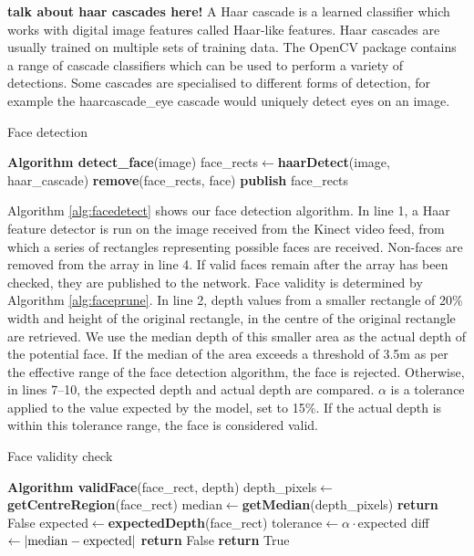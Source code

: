 \documentclass[conference]{IEEEtran}
\begin{document}
\textbf{talk about haar cascades here!}
A Haar cascade is a learned classifier which works with digital image features called Haar-like features. Haar cascades are usually trained on multiple sets of training data. The OpenCV package contains a range of cascade classifiers which can be used to perform a variety of detections. Some cascades are specialised to different forms of detection, for example the haarcascade\_eye cascade would uniquely detect eyes on an image.

\begin{algorithm}
  \caption{Face detection}
  \label{alg:facedetect}
  \begin{algorithmic}[1]
    \State \textbf{Algorithm detect\_face}\textnormal{(image)}
    \State face\_rects$\leftarrow$\textbf{haarDetect}(image, haar\_cascade)
    \State \textbf{remove}(face\_rects, face)
    \EndIf
    \EndFor
    \State \textbf{publish} face\_rects
  \end{algorithmic}
\end{algorithm}
Algorithm \ref{alg:facedetect} shows our face detection algorithm. In line 1, a Haar feature detector is run on the image received from the Kinect video feed, from which a series of rectangles representing possible faces are received. Non-faces are removed from the array in line 4. If valid faces remain after the array has been checked, they are published to the network. Face validity is determined by Algorithm \ref{alg:faceprune}. In line 2, depth values from a smaller rectangle of 20\% width and height of the original rectangle, in the centre of the original rectangle are retrieved. We use the median depth of this smaller area as the actual depth of the potential face. If the median of the area exceeds a threshold of 3.5m as per the effective range of the face detection algorithm, the face is rejected. Otherwise, in lines 7--10, the expected depth and actual depth are compared. $\alpha$ is a tolerance applied to the value expected by the model, set to 15\%. If the actual depth is within this tolerance range, the face is considered valid.

\begin{algorithm}
  \caption{Face validity check}
  \label{alg:faceprune}
  \begin{algorithmic}[1]
    \State \textbf{Algorithm validFace}\textnormal{(face\_rect, depth)}
    \State depth\_pixels$\leftarrow$\textbf{getCentreRegion}(face\_rect)
    \State median$\leftarrow$\textbf{getMedian}(depth\_pixels)
    \State \textbf{return} False
    \Else
    \State expected$\leftarrow$\textbf{expectedDepth}(face\_rect)
    \State tolerance$\leftarrow \alpha \cdot$expected
    \State diff$\leftarrow \left|\textnormal{median}-\textnormal{expected}\right|$
    \State \textbf{return} False
    \EndIf
    \EndIf
    \State \textbf{return} True
  \end{algorithmic}
\end{algorithm}
\end{document}
